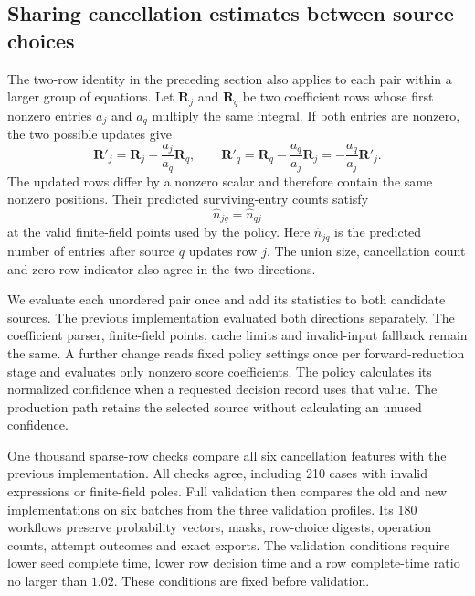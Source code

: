 \begin{samepage}
\subsection{Sharing cancellation estimates between source choices}
The two-row identity in the preceding section also applies to each pair
within a larger group of equations. Let $\boldsymbol R_j$ and
$\boldsymbol R_q$ be two coefficient rows whose first nonzero entries
$a_j$ and $a_q$ multiply the same integral. If both entries are nonzero,
the two possible updates give
\[
 \boldsymbol R'_j=\boldsymbol R_j-\frac{a_j}{a_q}\boldsymbol R_q,
 \qquad
 \boldsymbol R'_q=\boldsymbol R_q-\frac{a_q}{a_j}\boldsymbol R_j
             =-\frac{a_q}{a_j}\boldsymbol R'_j .
\]
The updated rows differ by a nonzero scalar and therefore contain the same
nonzero positions. Their predicted surviving-entry counts satisfy
\[
 \widehat n_{jq}=\widehat n_{qj}
\]
at the valid finite-field points used by the policy. Here $\widehat n_{jq}$
is the predicted number of entries after source $q$ updates row $j$.
The union size, cancellation count and zero-row indicator also agree in the
two directions.
\par\end{samepage}

We evaluate each unordered pair once and add its statistics to both candidate
sources. The previous implementation evaluated both directions separately.
The coefficient parser, finite-field points, cache limits and invalid-input
fallback remain the same. A further change reads fixed policy settings once
per forward-reduction stage and evaluates only nonzero score coefficients.
The policy calculates its normalized confidence when a requested decision
record uses that value. The production path retains the selected source
without calculating an unused confidence.

One thousand sparse-row checks compare all six cancellation features with
the previous implementation. All checks agree, including 210 cases with
invalid expressions or finite-field poles. Full validation then compares
the old and new implementations on six batches from the three validation
profiles. Its 180 workflows preserve probability vectors, masks, row-choice
digests, operation counts, attempt outcomes and exact exports. The validation
conditions require lower seed complete time, lower row decision time and
a row complete-time ratio no larger than $1.02$. These conditions are fixed
before validation.

